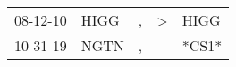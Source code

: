 \begin{supertabular}{p{0.07\textwidth}p{0.06\textwidth}p{0.02\textwidth}p{0.02\textwidth}p{0.06\textwidth}}
 08-12-10\textsuperscript{} &  HIGG\textsuperscript{} &  , &  \textgreater &  HIGG\textsuperscript{} \\
 10-31-19\textsuperscript{} &  NGTN\textsuperscript{} &  , &               &                   *CS1* \\
\end{supertabular}

